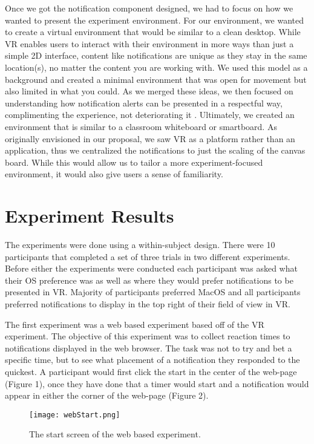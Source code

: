 \documentclass[acmlarge]{acmart}
\begin{document}
Once we got the notification component designed, we had to focus on how we wanted to present the experiment environment. For our environment, we wanted to create a virtual environment that would be similar to a clean desktop. While VR enables users to interact with their environment in more ways than just a simple 2D interface, content like notifications are unique as they stay in the same location(s), no matter the content you are working with. We used this model as a background and created a minimal environment that was open for movement but also limited in what you could. As we merged these ideas, we then focused on understanding how notification alerts can be presented in a respectful way, complimenting the experience, not deteriorating it \citet{Wiehr16,Imamov20}. Ultimately, we created an environment that is similar to a classroom whiteboard or smartboard. As originally envisioned in our proposal, we saw VR as a platform rather than an application, thus we centralized the notifications to just the scaling of the canvas board. While this would allow us to tailor a more experiment-focused environment, it would also give users a sense of familiarity.

\section{Experiment Results}
The experiments were done using a within-subject design. There were 10 participants that completed a set of three trials in two different experiments. Before either the experiments were conducted each participant was asked what their OS preference was as well as where they would prefer notifications to be presented in VR. Majority of participants preferred MacOS and all participants preferred notifications to display in the top right of their field of view in VR. 

The first experiment was a web based experiment based off of the VR experiment. The objective of this experiment was to collect reaction times to notifications displayed in the web browser. The task was not to try and bet a specific time, but to see what placement of a notification they responded to the quickest. A participant would first click the start in the center of the web-page (Figure 1), once they have done that a timer would start and a notification would appear in either the corner of the web-page (Figure 2). 
\begin{figure}[H]
  \caption{The start screen of the web based experiment.}
  \centering
  \texttt{[image: webStart.png]}
\end{figure}
\end{document}
